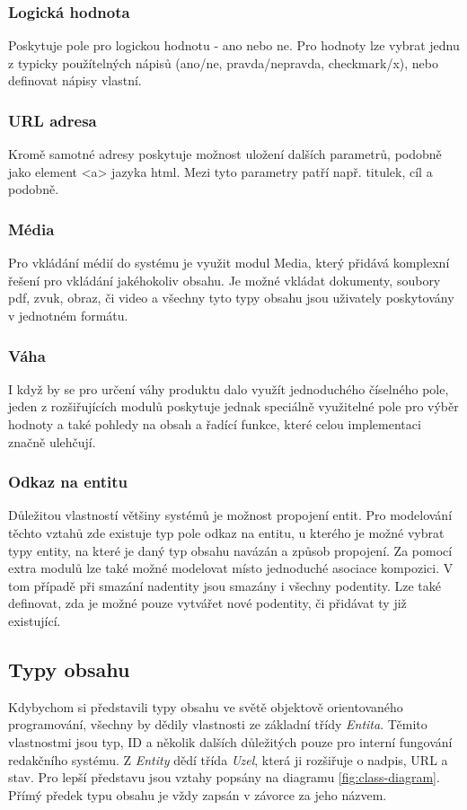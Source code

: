 \subsubsection*{Logická hodnota}
Poskytuje pole pro logickou hodnotu - ano nebo ne. Pro hodnoty lze vybrat jednu z typicky použítelných nápisů (ano/ne, pravda/nepravda, checkmark/x), nebo definovat nápisy vlastní. 

\subsubsection*{URL adresa}
Kromě samotné adresy poskytuje možnost uložení dalších parametrů, podobně jako element <a> jazyka html. Mezi tyto parametry patří např. titulek, cíl a podobně.

\subsubsection*{Média}
Pro vkládání médií do systému je využit modul Media, který přidává komplexní řešení pro vkládání jakéhokoliv obsahu. Je možné vkládat dokumenty, soubory pdf, zvuk, obraz, či video a všechny tyto typy obsahu jsou uživately poskytovány v jednotném formátu.

\subsubsection*{Váha}
I když by se pro určení váhy produktu dalo využít jednoduchého číselného pole, jeden z rozšiřujících modulů poskytuje jednak speciálně využitelné pole pro výběr hodnoty a také pohledy na obsah a řadící funkce, které celou implementaci značně ulehčují.

\subsubsection*{Odkaz na entitu}
Důležitou vlastností většiny systémů je možnost propojení entit. Pro modelování těchto vztahů zde existuje typ pole odkaz na entitu, u kterého je možné vybrat typy entity, na které je daný typ obsahu navázán a způsob propojení. Za pomocí extra modulů lze také možné modelovat místo jednoduché asociace kompozici. V tom případě při smazání nadentity jsou smazány i všechny podentity. Lze také definovat, zda je možné pouze vytvářet nové podentity, či přidávat ty již existující.

\subsection{Typy obsahu}
Kdybychom si představili typy obsahu ve světě objektově orientovaného programování, všechny by dědily vlastnosti ze základní třídy \emph{Entita}. Těmito vlastnostmi jsou typ, ID a několik dalších důležitých pouze pro interní fungování redakčního systému. Z \emph{Entity} dědí třída \emph{Uzel}, která ji rozšiřuje o nadpis, URL a stav. Pro lepší představu jsou vztahy popsány na diagramu \ref{fig:class-diagram}. Přímý předek typu obsahu je vždy zapsán v závorce za jeho názvem.

